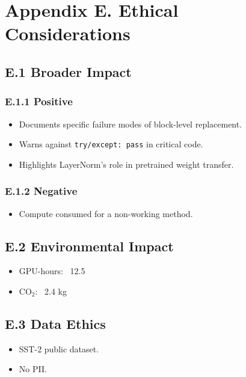 \section{Appendix E. Ethical Considerations}

\subsection{E.1 Broader Impact}

\subsubsection{E.1.1 Positive}

\begin{itemize}
\item Documents specific failure modes of block-level replacement.
\item Warns against \texttt{try/except: pass} in critical code.
\item Highlights LayerNorm's role in pretrained weight transfer.

\end{itemize}
\subsubsection{E.1.2 Negative}

\begin{itemize}
\item Compute consumed for a non-working method.

\end{itemize}
\subsection{E.2 Environmental Impact}

\begin{itemize}
\item GPU-hours: ~12.5
\item CO$_2$: ~2.4 kg

\end{itemize}
\subsection{E.3 Data Ethics}

\begin{itemize}
\item SST-2 public dataset.
\item No PII.

\end{itemize}
